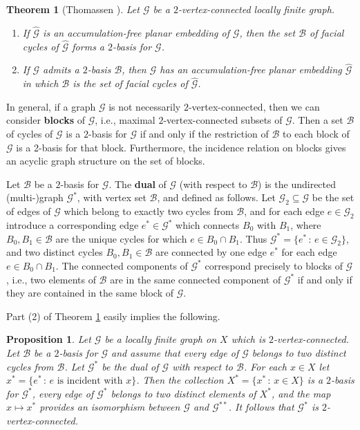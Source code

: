 \documentclass[11pt]{amsart}
\theoremstyle{definition}
\theoremstyle{plain}
\newtheorem{theorem}[definition]{Theorem}
\newtheorem{proposition}[definition]{Proposition}
\newcommand{\<}{\langle}
\renewcommand{\>}{\rangle}
\newcommand{\mc}[1]{\mathcal{#1}}
\newcommand{\wh}[1]{\widehat{#1}}
\newcommand{\Ggraph}{\mathcal{G}}
\newcommand{\define}[1]{\textbf{#1}}
\begin{document}
\begin{theorem}[Thomassen \cite{Tho80}]\label{thm:Thomassen}
Let ${\Ggraph}$ be a $2$-vertex-connected locally finite graph.
\begin{enumerate}
\item If $\wh{{\Ggraph}}$ is an accumulation-free planar embedding of ${\Ggraph}$, then the set $\mc{B}$ of facial cycles of $\wh{{\Ggraph}}$ forms a $2$-basis for ${\Ggraph}$.

\item If ${\Ggraph}$ admits a $2$-basis $\mc{B}$, then ${\Ggraph}$ has an accumulation-free planar embedding $\wh{{\Ggraph}}$ in which $\mc{B}$ is the set of facial cycles of $\wh{{\Ggraph}}$.
\end{enumerate}
\end{theorem}

In general, if a graph ${\Ggraph}$ is not necessarily $2$-vertex-connected,
then we can consider \define{blocks} of ${\Ggraph}$, i.e., maximal $2$-vertex-connected subsets of ${\Ggraph}$. Then a set $\mc{B}$ of cycles of ${\Ggraph}$ is a $2$-basis for ${\Ggraph}$ if and only if the restriction of $\mc{B}$ to each block of ${\Ggraph}$ is a 2-basis for that block. Furthermore, the incidence relation on blocks gives an acyclic graph structure on the set of blocks.

Let $\mc{B}$ be a $2$-basis for ${\Ggraph}$. The \define{dual} of ${\Ggraph}$ (with respect to $\mc{B}$) is the undirected (multi-)graph ${\Ggraph}^*$, with vertex set $\mc{B}$, and defined as follows. Let ${\Ggraph}_2\subseteq \Ggraph$ be the set of edges of $\Ggraph$ which belong to exactly two cycles from $\mc{B}$, and for each edge $e\in \Ggraph _2$ introduce a corresponding edge $e^*\in {\Ggraph}^*$ which connects $B_0$ with $B_1$, where $B_0,B_1\in\mc{B}$ are the unique cycles for which $e\in B_0\cap B_1$. Thus ${\Ggraph}^* = \{ e^* \, : \, e\in {\Ggraph}_2 \}$, and two distinct cycles $B_0, B_1\in \mc{B}$ are connected by one edge $e^*$ for each edge $e\in B_0\cap B_1$. The connected components of ${\Ggraph}^*$ correspond precisely to blocks of ${\Ggraph}$, i.e., two elements of $\mc{B}$ are in the same connected component of ${\Ggraph}^*$ if and only if they are contained in the same block of ${\Ggraph}$. 

Part (2) of Theorem \ref{thm:Thomassen} easily implies the following.

\begin{proposition}\label{prop:ddual}
Let ${\Ggraph}$ be a locally finite graph on $X$ which is $2$-vertex-connected. Let $\mc{B}$ be a $2$-basis for ${\Ggraph}$ and assume that every edge of ${\Ggraph}$ belongs to two distinct cycles from $\mc{B}$. Let $\Ggraph ^*$ be the dual of ${\Ggraph}$ with respect to $\mc{B}$. For each $x\in X$ let $x^* = \{ e ^* \, : \, e\text{ is incident with }x \}$. 
Then the collection $X^* = \{ x^* \, : \, x\in X \}$ is a $2$-basis for ${\Ggraph}^*$, every edge of ${\Ggraph}^*$ belongs to two distinct elements of $X^*$, and the map $x\mapsto x^*$ provides an isomorphism between ${\Ggraph}$ and ${\Ggraph}^{**}$.
It follows that $\mathcal{G}^*$ is $2$-vertex-connected.
\end{proposition}
\end{document}
